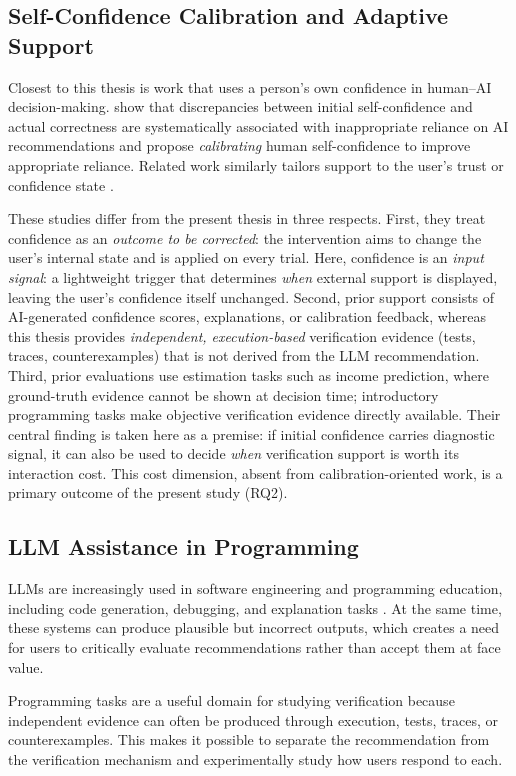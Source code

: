 \documentclass[oneside,final,14pt,a4paper]{extreport}
\theoremstyle{definition}
\theoremstyle{remark}
\begin{document}
\subsection{Self-Confidence Calibration and Adaptive Support}
Closest to this thesis is work that uses a person's own confidence in
human--AI decision-making. \cite{ToRelyOrNotToRely2024} show that
discrepancies between initial self-confidence and actual correctness are
systematically associated with inappropriate reliance on AI recommendations
and propose \emph{calibrating} human self-confidence to improve appropriate
reliance. Related work similarly tailors support to the user's trust or
confidence state \cite{Xie2025AdjustForTrust}.

These studies differ from the present thesis in three respects. First, they
treat confidence as an \emph{outcome to be corrected}: the intervention aims
to change the user's internal state and is applied on every trial. Here,
confidence is an \emph{input signal}: a lightweight trigger that determines
\emph{when} external support is displayed, leaving the user's confidence
itself unchanged. Second, prior support consists of AI-generated confidence
scores, explanations, or calibration feedback, whereas this thesis provides
\emph{independent, execution-based} verification evidence (tests, traces,
counterexamples) that is not derived from the LLM recommendation. Third,
prior evaluations use estimation tasks such as income prediction, where
ground-truth evidence cannot be shown at decision time; introductory
programming tasks make objective verification evidence directly available.
Their central finding is taken here as a premise: if initial confidence
carries diagnostic signal, it can also be used to decide \emph{when}
verification support is worth its interaction cost. This cost dimension,
absent from calibration-oriented work, is a primary outcome of the present
study (RQ2).

\subsection{LLM Assistance in Programming}
LLMs are increasingly used in software engineering and programming education,
including code generation, debugging, and explanation tasks
\cite{Ma2023,Cambaz2024}. At the same time, these systems can produce plausible
but incorrect outputs, which creates a need for users to critically evaluate
recommendations rather than accept them at face value.

Programming tasks are a useful domain for studying verification because
independent evidence can often be produced through execution, tests, traces, or
counterexamples. This makes it possible to separate the recommendation from the
verification mechanism and experimentally study how users respond to each.
\end{document}
